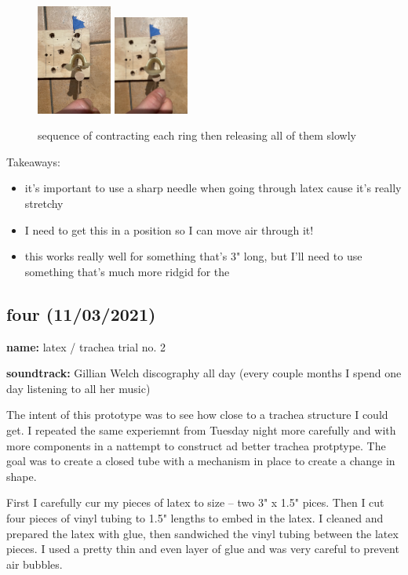 \documentclass[11pt]{report}
\begin{document}
\begin{figure}[h]
  \includegraphics[width=0.22\textwidth]{images/51.JPG}
  \includegraphics[width=0.22\textwidth]{images/52.JPG}
  \caption{sequence of contracting each ring then releasing all of them slowly}
\end{figure}


Takeaways:
\begin{itemize}
\item
it's important to use a sharp needle when going through latex cause it's really stretchy
\item
I need to get this in a position so I can move air through it!
\item
  this works really well for something that's 3" long, but I'll need to use something that's much more ridgid for the 
\end{itemize}
\clearpage
\subsection*{four (11/03/2021)}
\textbf{name:} latex / trachea trial no. 2

\textbf{soundtrack:} Gillian Welch discography all day (every couple months I spend one day listening to all her music) 

The intent of this prototype was to see how close to a trachea structure I could get. I repeated the same experiemnt from Tuesday night more carefully and with more components in a nattempt to construct ad better trachea protptype. The goal was to create a closed tube with a mechanism in place to create a change in shape.

First I carefully cur my pieces of latex to size -- two 3" x 1.5" pices. Then I cut four pieces of vinyl tubing to 1.5" lengths to embed in the latex. I cleaned and prepared the latex with glue, then sandwiched the vinyl tubing between the latex pieces. I used a pretty thin and even layer of glue and was very careful to prevent air bubbles. 
\end{document}
